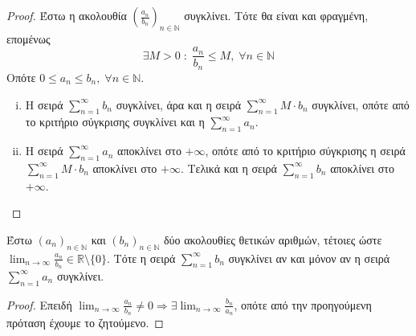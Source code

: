 \begin{proof}
\item {}
    Έστω η ακολουθία $ {\left(\frac{a_{n}}{b_{n}}\right)}_{n \in \mathbb{N}} $ 
    συγκλίνει.  Τότε θα είναι και φραγμένη, επομένως
    \[
        \exists M>0 \; : \; \frac{a_{n}}{b_{n}} \leq M, \; \forall n \in \mathbb{N} 
    \] 
    Οπότε $ 0 \leq a_{n} \leq b_{n}, \; \forall n \in \mathbb{N} $.
    \begin{enumerate}[i)]
        \item Η σειρά $ \sum_{n=1}^{\infty} b_{n} $ συγκλίνει, άρα και η σειρά 
            $ \sum_{n=1}^{\infty} M\cdot b_{n} $ συγκλίνει, οπότε από το κριτήριο 
            σύγκρισης συγκλίνει και η $ \sum_{n=1}^{\infty} a_{n} $.
        \item Η σειρά $ \sum_{n=1}^{\infty} a_{n} $ αποκλίνει στο $ + \infty $, 
            οπότε από το κριτήριο σύγκρισης η σειρά 
            $ \sum_{n=1}^{\infty} M \cdot b_{n} $ αποκλίνει
            στο $ + \infty $. Τελικά και η σειρά $ \sum_{n=1}^{\infty} b_{n} $ 
            αποκλίνει στο $ + \infty $.
    \end{enumerate}
\end{proof}

\begin{cor}
    Έστω $ {(a_{n})}_{n \in \mathbb{N}} $ και $ {(b_{n})}_{n \in \mathbb{N}} $ δύο 
    ακολουθίες θετικών αριθμών, τέτοιες ώστε $ \lim_{n \to \infty} \frac{a_{n}}{b_{n}} 
    \in \mathbb{R} \setminus \{ 0 \}$. Τότε η σειρά $ \sum_{n=1}^{\infty} b_{n} $ 
    συγκλίνει αν και μόνον αν η σειρά $ \sum_{n=1}^{\infty} a_{n} $ συγκλίνει.
\end{cor}
\begin{proof}
    Επειδή $ \lim_{n \to \infty} \frac{a_{n}}{b_{n}} \neq 0 \Rightarrow \exists 
    \lim_{n \to \infty} \frac{b_{n}}{a_{n}}$, οπότε από την προηγούμενη πρόταση 
    έχουμε το ζητούμενο.
\end{proof}

